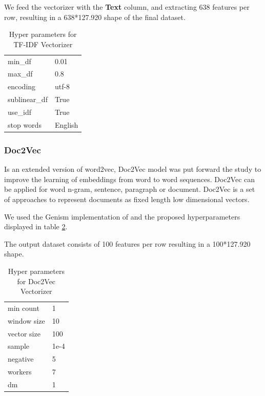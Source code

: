 \documentclass{article}
\begin{document}
We feed the vectorizer with the \textbf{Text} column, and extracting 638 features per row,
resulting in a 638*127.920 shape of the final dataset.

\begin{table}[h]
  \centering
  \begin{tabular}{ll}
  \hline
  min\_df       & 0.01                      \\
  max\_df       & 0.8 \\
  encoding      & utf-8                  \\
  sublinear\_df & True                   \\
  use\_idf      & True                   \\
  stop words    & English                \\ \hline
  \end{tabular}
  \caption{Hyper parameters for TF-IDF Vectorizer}
  \label{hyptfidf}
\end{table}

\subsubsection{Doc2Vec}

Is an extended version of word2vec, Doc2Vec model was put forward the study \cite{doc2vec} to improve 
the learning of embeddings from word to word sequences. Doc2Vec can be applied 
for word n-gram, sentence, paragraph or document. Doc2Vec is a set of 
approaches to represent documents as fixed length low dimensional vectors.

We used the Genism \cite{Genism} implementation of and the proposed hyperparameters \cite{studyPaper}
displayed in table \ref{hypdoc2vec}.

The output dataset consists of 100 features per row resulting in a 100*127.920 shape.

\begin{table}[h]
  \centering
  \begin{tabular}{ll}
  \hline
  min count   & 1    \\
  window size & 10   \\
  vector size & 100  \\
  sample      & 1e-4 \\
  negative    & 5    \\
  workers     & 7    \\
  dm          & 1    \\ \hline
  \end{tabular}
  \caption{Hyper parameters for Doc2Vec Vectorizer}
  \label{hypdoc2vec}
\end{table}
\end{document}
